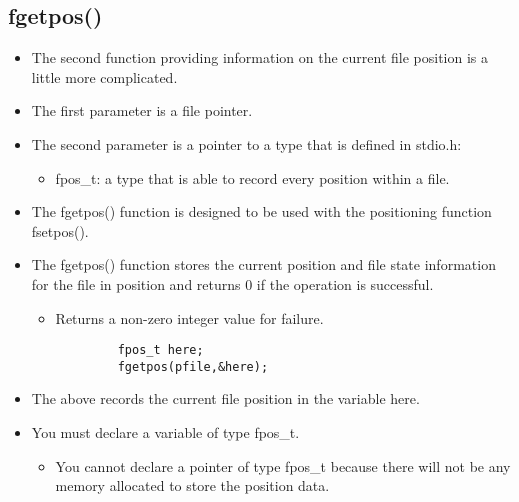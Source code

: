 \subsection{fgetpos()}
\begin{itemize}
    \item The second function providing information on the current file position is a little more complicated.
    
    \item The first parameter is a file pointer.
    \item The second parameter is a pointer to a type that is defined in stdio.h:
        \begin{itemize}
            \item fpos\_t: a type that is able to record every position within a file.
        \end{itemize}
    
    \item The fgetpos() function is designed to be used with the positioning function fsetpos().
    \item The fgetpos() function stores the current position and file state information for the file in position and returns 0 if the operation is successful.
        \begin{itemize}
            \item Returns a non-zero integer value for failure.
        \end{itemize}
        \begin{verbatim}
            fpos_t here;
            fgetpos(pfile,&here);
        \end{verbatim}
    
    \item The above records the current file position in the variable here.
    \item You must declare a variable of type fpos\_t.
        \begin{itemize}
            \item You cannot declare a pointer of type fpos\_t because there will not be any memory allocated to store the position data.
        \end{itemize}
    
\end{itemize}

